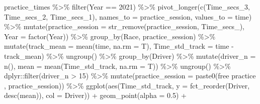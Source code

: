 \documentclass[
]{book}
\newenvironment{Shaded}{\begin{snugshade}}{\end{snugshade}}
\newcommand{\AttributeTok}[1]{\textcolor[rgb]{0.77,0.63,0.00}{#1}}
\newcommand{\DecValTok}[1]{\textcolor[rgb]{0.00,0.00,0.81}{#1}}
\newcommand{\FloatTok}[1]{\textcolor[rgb]{0.00,0.00,0.81}{#1}}
\newcommand{\FunctionTok}[1]{\textcolor[rgb]{0.00,0.00,0.00}{#1}}
\newcommand{\NormalTok}[1]{#1}
\newcommand{\SpecialCharTok}[1]{\textcolor[rgb]{0.00,0.00,0.00}{#1}}
\newcommand{\StringTok}[1]{\textcolor[rgb]{0.31,0.60,0.02}{#1}}
\begin{document}
\begin{Shaded}
\begin{Highlighting}[]
\NormalTok{practice\_times }\SpecialCharTok{\%\textgreater{}\%}
  \FunctionTok{filter}\NormalTok{(Year }\SpecialCharTok{==} \DecValTok{2021}\NormalTok{) }\SpecialCharTok{\%\textgreater{}\%} 
  \FunctionTok{pivot\_longer}\NormalTok{(}\FunctionTok{c}\NormalTok{(Time\_secs\_3, Time\_secs\_2, Time\_secs\_1), }\AttributeTok{names\_to =} \StringTok{\textquotesingle{}practice\_session\textquotesingle{}}\NormalTok{, }\AttributeTok{values\_to =} \StringTok{\textquotesingle{}time\textquotesingle{}}\NormalTok{) }\SpecialCharTok{\%\textgreater{}\%}
  \FunctionTok{mutate}\NormalTok{(}\AttributeTok{practice\_session =} \FunctionTok{str\_remove}\NormalTok{(practice\_session, }\StringTok{\textquotesingle{}Time\_secs\_\textquotesingle{}}\NormalTok{),}
         \AttributeTok{Year =} \FunctionTok{factor}\NormalTok{(Year)) }\SpecialCharTok{\%\textgreater{}\%}
   \FunctionTok{group\_by}\NormalTok{(Race, practice\_session) }\SpecialCharTok{\%\textgreater{}\%}
   \FunctionTok{mutate}\NormalTok{(}\AttributeTok{track\_mean =} \FunctionTok{mean}\NormalTok{(time, }\AttributeTok{na.rm =}\NormalTok{ T),}
          \AttributeTok{Time\_std\_track =}\NormalTok{ time }\SpecialCharTok{{-}}\NormalTok{ track\_mean) }\SpecialCharTok{\%\textgreater{}\%} 
   \FunctionTok{ungroup}\NormalTok{() }\SpecialCharTok{\%\textgreater{}\%} 
   \FunctionTok{group\_by}\NormalTok{(Driver) }\SpecialCharTok{\%\textgreater{}\%} 
   \FunctionTok{mutate}\NormalTok{(}\AttributeTok{driver\_n =} \FunctionTok{n}\NormalTok{(),}
          \AttributeTok{mean =} \FunctionTok{mean}\NormalTok{(Time\_std\_track, }\AttributeTok{na.rm =}\NormalTok{ T)) }\SpecialCharTok{\%\textgreater{}\%}
   \FunctionTok{ungroup}\NormalTok{() }\SpecialCharTok{\%\textgreater{}\%}
\NormalTok{   dplyr}\SpecialCharTok{::}\FunctionTok{filter}\NormalTok{(driver\_n }\SpecialCharTok{\textgreater{}} \DecValTok{15}\NormalTok{) }\SpecialCharTok{\%\textgreater{}\%} 
  \FunctionTok{mutate}\NormalTok{(}\AttributeTok{practice\_session =} \FunctionTok{paste0}\NormalTok{(}\StringTok{\textquotesingle{}free practice \textquotesingle{}}\NormalTok{, practice\_session)) }\SpecialCharTok{\%\textgreater{}\%}  
   \FunctionTok{ggplot}\NormalTok{(}\FunctionTok{aes}\NormalTok{(Time\_std\_track, }\AttributeTok{y =} \FunctionTok{fct\_reorder}\NormalTok{(Driver, }\FunctionTok{desc}\NormalTok{(mean)), }\AttributeTok{col =}\NormalTok{ Driver)) }\SpecialCharTok{+}
   \FunctionTok{geom\_point}\NormalTok{(}\AttributeTok{alpha =} \FloatTok{0.5}\NormalTok{) }\SpecialCharTok{+}

\end{Highlighting}
\end{Shaded}
\end{document}
